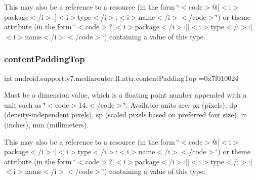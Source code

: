 This may also be a reference to a resource (in the form \char`\"{}$<$code$>$@\mbox{[}$<$i$>$package$<$/i$>$\+:\mbox{]}$<$i$>$type$<$/i$>$\+:$<$i$>$name$<$/i$>$$<$/code$>$\char`\"{}) or theme attribute (in the form \char`\"{}$<$code$>$?\mbox{[}$<$i$>$package$<$/i$>$\+:\mbox{]}\mbox{[}$<$i$>$type$<$/i$>$\+:\mbox{]}$<$i$>$name$<$/i$>$$<$/code$>$\char`\"{}) containing a value of this type. \mbox{\label{classandroid_1_1support_1_1v7_1_1mediarouter_1_1R_1_1attr_a612977c1ba0bac751e77b8512e53743a}} 
\subsubsection{\texorpdfstring{content\+Padding\+Top}{contentPaddingTop}}
{\footnotesize\ttfamily int android.\+support.\+v7.\+mediarouter.\+R.\+attr.\+content\+Padding\+Top =0x7f010024\hspace{0.3cm}{\ttfamily [static]}}

Must be a dimension value, which is a floating point number appended with a unit such as \char`\"{}$<$code$>$14.\+5sp$<$/code$>$\char`\"{}. Available units are\+: px (pixels), dp (density-\/independent pixels), sp (scaled pixels based on preferred font size), in (inches), mm (millimeters). 

This may also be a reference to a resource (in the form \char`\"{}$<$code$>$@\mbox{[}$<$i$>$package$<$/i$>$\+:\mbox{]}$<$i$>$type$<$/i$>$\+:$<$i$>$name$<$/i$>$$<$/code$>$\char`\"{}) or theme attribute (in the form \char`\"{}$<$code$>$?\mbox{[}$<$i$>$package$<$/i$>$\+:\mbox{]}\mbox{[}$<$i$>$type$<$/i$>$\+:\mbox{]}$<$i$>$name$<$/i$>$$<$/code$>$\char`\"{}) containing a value of this type. \mbox{\label{classandroid_1_1support_1_1v7_1_1mediarouter_1_1R_1_1attr_a805598343f4fecc958998b8eb6d74a18}} 

